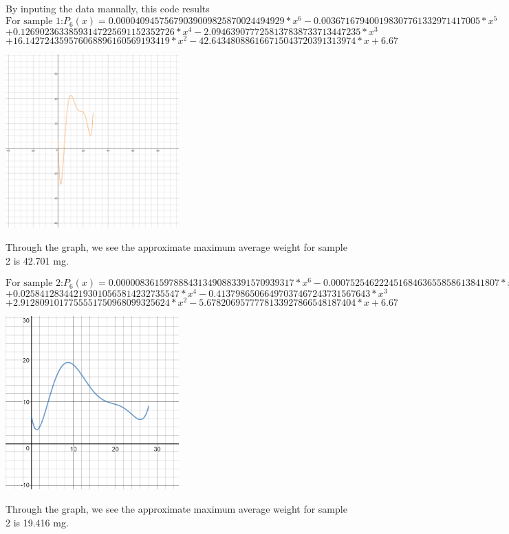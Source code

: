\documentclass{article}
\begin{document}
\\By inputing the data manually, this code results
\[\text{For sample 1:} P_6(x)=0.00004094575679039009825870024494929*x^6 - 0.003671679400198307761332971417005*x^5\]\[ + 0.12690236338593147225691152352726*x^4 - 2.0946390777258137838733713447235*x^3 \]\[+ 16.142724359576068896160569193419*x^2 - 42.643480886166715043720391313974*x + 6.67
\] 
\begin{center}\includegraphics[width=0.5\textwidth]{191}\end{center}\begin{center}Through the graph, we see the approximate maximum average weight for sample 2 is 42.701 mg.\end{center}
\[\text{For sample 2:} P_6(x)=0.0000083615978884313490883391570939317*x^6 - 0.00075254622245168463655858613841807*x^5 \]\[+ 0.025841283442193010565814232735547*x^4 - 0.41379865066497037467243731567643*x^3 \]\[+ 2.9128091017755551750968099325624*x^2 - 5.6782069577778133927866548187404*x + 6.67
\]
\begin{center}\includegraphics[width=0.5\textwidth]{192}\end{center}\begin{center}Through the graph, we see the approximate maximum average weight for sample 2 is 19.416 mg.\end{center}
\end{document}
